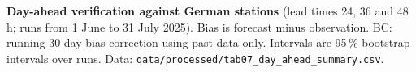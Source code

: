 \begin{table}[t]
\centering\small
\caption{\textbf{Day-ahead verification against \valNumStations{} German stations} (lead times 24, 36 and 48\,h; \valNumEvalRuns{} runs from 1 June to 31 July 2025). Bias is forecast minus observation. BC: running 30-day bias correction using past data only. Intervals are 95\,\% bootstrap intervals over runs. Data: \texttt{data/processed/tab07\_day\_ahead\_summary.csv}.}
\label{tab:da}
\setlength{\tabcolsep}{5pt}

\end{table}
